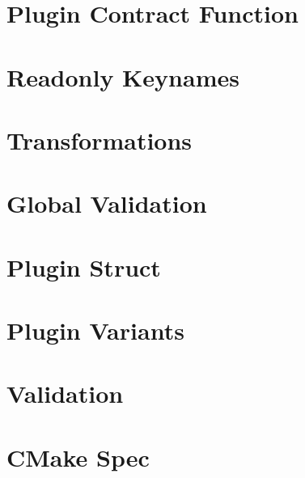 \let\mypdfximage\pdfximage\def\pdfximage{\immediate\mypdfximage}\documentclass[twoside]{book}
\newcommand{\+}{\discretionary{\mbox{\scriptsize$\hookleftarrow$}}{}{}}
\begin{document}
\chapter{Plugin Contract Function}
\label{doc_decisions_0_drafts_plugin_contract_function_md}

\chapter{Readonly Keynames}
\label{doc_decisions_0_drafts_readonly_keynames_md}

\chapter{Transformations}
\label{doc_decisions_0_drafts_transformations_md}

\chapter{Global Validation}
\label{doc_decisions_0a_postponed_global_validation_md}

\chapter{Plugin Struct}
\label{doc_decisions_0a_postponed_plugin_struct_md}

\chapter{Plugin Variants}
\label{doc_decisions_0a_postponed_plugin_variants_md}

\chapter{Validation}
\label{doc_decisions_0a_postponed_validation_md}

\chapter{CMake Spec}
\label{doc_decisions_0b_rejected_cmake_spec_md}

\end{document}
